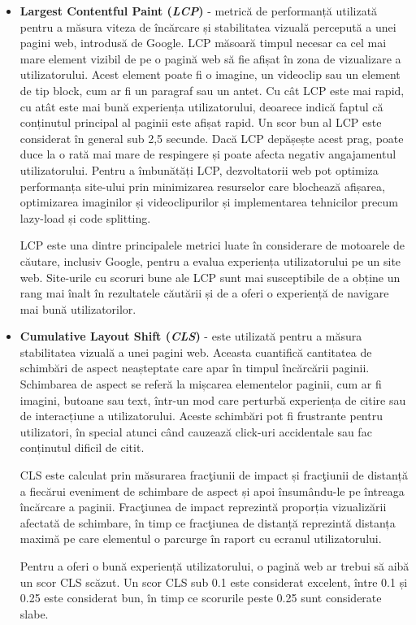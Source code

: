 \documentclass[12pt, a4paper]{report}
\begin{document}
\begin{itemize}
	\item \textbf{Largest Contentful Paint (\emph{LCP})} - metrică de performanță utilizată pentru a măsura viteza de încărcare și stabilitatea vizuală percepută a unei pagini web, introdusă de Google. LCP măsoară timpul necesar ca cel mai mare element vizibil de pe o pagină web să fie afișat în zona de vizualizare a utilizatorului. Acest element poate fi o imagine, un videoclip sau un element de tip block, cum ar fi un paragraf sau un antet. Cu cât LCP este mai rapid, cu atât este mai bună experiența utilizatorului, deoarece indică faptul că conținutul principal al paginii este afișat rapid. Un scor bun al LCP este considerat în general sub 2,5 secunde. Dacă LCP depășește acest prag, poate duce la o rată mai mare de respingere și poate afecta negativ angajamentul utilizatorului. Pentru a îmbunătăți LCP, dezvoltatorii web pot optimiza performanța site-ului prin minimizarea resurselor care blochează afișarea, optimizarea imaginilor și videoclipurilor și implementarea tehnicilor precum lazy-load și code splitting.

	      LCP este una dintre principalele metrici luate în considerare de motoarele de căutare, inclusiv Google, pentru a evalua experiența utilizatorului pe un site web. Site-urile cu scoruri bune ale LCP sunt mai susceptibile de a obține un rang mai înalt în rezultatele căutării și de a oferi o experiență de navigare mai bună utilizatorilor.
	\item \textbf{Cumulative Layout Shift (\emph{CLS})} - este utilizată pentru a măsura stabilitatea vizuală a unei pagini web. Aceasta cuantifică cantitatea de schimbări de aspect neașteptate care apar în timpul încărcării paginii. Schimbarea de aspect se referă la mișcarea elementelor paginii, cum ar fi imagini, butoane sau text, într-un mod care perturbă experiența de citire sau de interacțiune a utilizatorului. Aceste schimbări pot fi frustrante pentru utilizatori, în special atunci când cauzează click-uri accidentale sau fac conținutul dificil de citit.

	      CLS este calculat prin măsurarea frac\c tiunii de impact și frac\c tiunii de distanță a fiecărui eveniment de schimbare de aspect și apoi însumându-le pe întreaga încărcare a paginii. Frac\c tiunea de impact reprezintă proporția vizualizării afectată de schimbare, în timp ce frac\c tiunea de distanță reprezintă distanța maximă pe care elementul o parcurge în raport cu ecranul utilizatorului.

	      Pentru a oferi o bună experiență utilizatorului, o pagină web ar trebui să aibă un scor CLS scăzut. Un scor CLS sub 0.1 este considerat excelent, între 0.1 și 0.25 este considerat bun, în timp ce scorurile peste 0.25 sunt considerate slabe.


\end{itemize}
\end{document}
